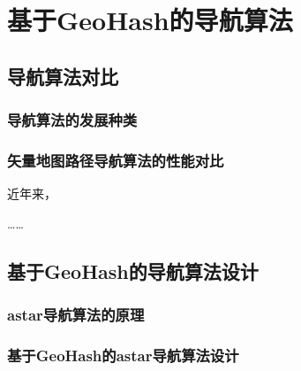 \chapter{基于GeoHash的导航算法}
\label{chap:intro}
\section{导航算法对比}
\subsection{导航算法的发展种类}
\subsection{矢量地图路径导航算法的性能对比}
近年来，

……

\section{基于GeoHash的导航算法设计}
\subsection{astar导航算法的原理}
\subsection{基于GeoHash的astar导航算法设计}